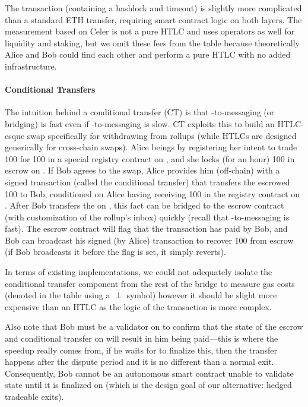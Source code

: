 The transaction (containing a hashlock and timeout) is slightly more complicated than a standard ETH transfer, requiring smart contract logic on both layers. The measurement based on Celer is not a pure HTLC and uses operators as well for liquidity and staking, but we omit these fees from the table because theoretically Alice and Bob could find each other and perform a pure HTLC with no added infrastructure. %

\paragraph*{Conditional Transfers} The intuition behind a conditional transfer (CT) is that \layerone-to-\layertwo messaging (or bridging) is fast even if \layertwo-to-\layerone messaging is slow. CT exploits this to build an HTLC-esque swap specifically for withdrawing from rollups (while HTLCs are designed generically for cross-chain swaps). Alice beings by registering her intent to trade 100 \ethtwo for 100 \ethone in a special registry contract on \layerone, and she locks (\eg for an hour) 100 \ethtwo in escrow on \layertwo. If Bob agrees to the swap, Alice provides him (off-chain) with a signed transaction (called the conditional transfer) that transfers the escrowed 100 \ethtwo to Bob, conditioned on Alice having receiving 100 \ethone in the registry contract on \layerone. After Bob transfers the \ethone on \layerone, this fact can be bridged to the \layertwo escrow contract (with customization of the rollup's inbox) quickly (recall that \layerone-to-\layertwo messaging is fast). The \layertwo escrow contract will flag that the \layerone transaction has paid by Bob, and Bob can broadcast his signed (by Alice) \layertwo transaction to recover 100 \ethtwo from escrow (if Bob broadcasts it before the flag is set, it simply reverts). 

In terms of existing implementations, we could not adequately isolate the conditional transfer component from the rest of the bridge to measure gas costs (denoted in the table using a $\perp$ symbol) however it should be slight more expensive than an HTLC as the logic of the transaction is more complex. 

Also note that Bob must be a validator on \layertwo to confirm that the state of the escrow and conditional transfer on \layertwo will result in him being paid---this is where the speedup really comes from, if he waits for \layerone to finalize this, then the transfer happens after the dispute period and it is no different than a normal exit. Consequently, Bob cannot be an autonomous \layerone smart contract unable to validate \layertwo state until it is finalized on \layerone (which is the design goal of our alternative: hedged tradeable exits). 

